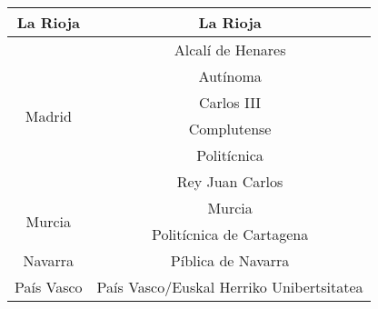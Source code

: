 \begin{longtable}{|c|c|}
    La Rioja & La Rioja \\\hline
    \multirow{6}{2cm}{Madrid} & Alcalí de Henares \\
        & Autínoma \\
        & Carlos III \\
        & Complutense\\
        & Politícnica \\
        & Rey Juan Carlos \\\hline
    \multirow{2}{2cm}{Murcia} & Murcia \\
        & Politícnica de Cartagena \\\hline
    Navarra & Píblica de Navarra \\\hline
    País Vasco & País Vasco/Euskal Herriko Unibertsitatea  \\
\end{longtable} 
